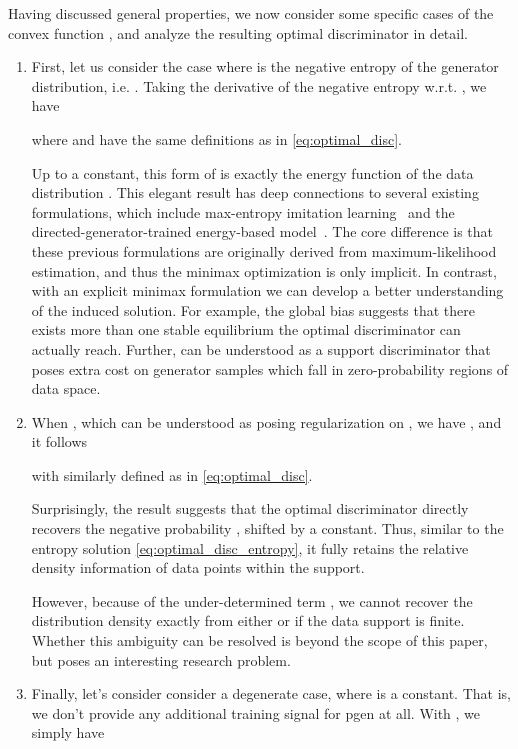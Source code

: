 \documentclass[a4paper]{article}
\newcommand{\article}{paper\xspace}
\begin{document}
Having discussed general properties, we now consider some specific cases of the convex function , and analyze the resulting optimal discriminator  in detail.
\begin{enumerate}[leftmargin=16pt,labelindent=16pt]
\item First, let us consider the case where  is the negative entropy of the generator distribution, i.e. . 
Taking the derivative of the negative entropy w.r.t. , we have 

where  and  have the same definitions as in \eqref{eq:optimal_disc}.

Up to a constant, this form of  is exactly the energy function of the data distribution .
This elegant result has deep connections to several existing formulations, which include max-entropy imitation learning~\citep{ziebart2008maximum} and the directed-generator-trained energy-based model~\citep{kim2016deep}.
The core difference is that these previous formulations are originally derived from maximum-likelihood estimation, and thus the minimax optimization is only implicit.
In contrast, with an explicit minimax formulation we can develop a better understanding of the induced solution.
For example, the global bias  suggests that there exists more than one stable equilibrium the optimal discriminator can actually reach.
Further,  can be understood as a support discriminator that poses extra cost on generator samples which fall in zero-probability regions of data space.


\item When , which can be understood as posing  regularization on , we have , and it follows

with  similarly defined as in \eqref{eq:optimal_disc}.

Surprisingly, the result suggests that the optimal discriminator  directly recovers the negative probability , shifted by a constant.
Thus, similar to the entropy solution \eqref{eq:optimal_disc_entropy}, it fully retains the relative density information of data points within the support.

However, because of the under-determined term , we cannot recover the distribution density  exactly from either  or  if the data support is finite.
Whether this ambiguity can be resolved is beyond the scope of this \article, but poses an interesting research problem. 



\item Finally, let's consider consider a degenerate case, where  is a constant. 
That is, we don’t provide
any additional training signal for pgen at all. With , we simply have


\end{enumerate}
\end{document}
